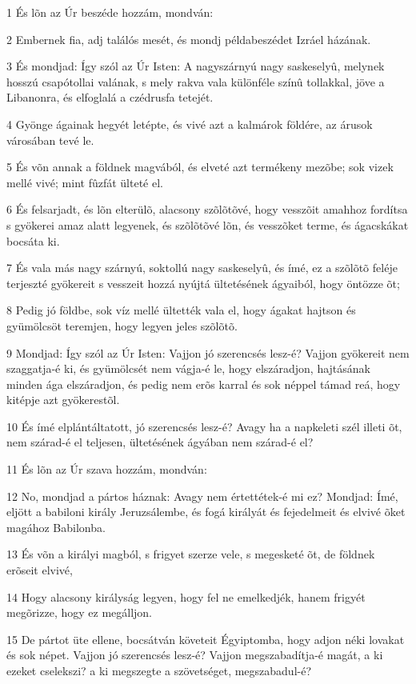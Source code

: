 \par 1 És lõn az Úr beszéde hozzám, mondván:
\par 2 Embernek fia, adj találós mesét, és mondj példabeszédet Izráel házának.
\par 3 És mondjad: Így szól az Úr Isten: A nagyszárnyú nagy saskeselyû, melynek hosszú csapótollai valának, s mely rakva vala különféle színû tollakkal, jöve a Libanonra, és elfoglalá a czédrusfa tetejét.
\par 4 Gyönge ágainak hegyét letépte, és vivé azt a kalmárok földére, az árusok városában tevé le.
\par 5 És võn annak a földnek magvából, és elveté azt termékeny mezõbe; sok vizek mellé vivé; mint fûzfát ülteté el.
\par 6 És felsarjadt, és lõn elterülõ, alacsony szõlõtõvé, hogy vesszõit amahhoz fordítsa s gyökerei amaz alatt legyenek, és szõlõtõvé lõn, és vesszõket terme, és ágacskákat bocsáta ki.
\par 7 És vala más nagy szárnyú, soktollú nagy saskeselyû, és ímé, ez a szõlõtõ feléje terjeszté gyökereit s vesszeit hozzá nyújtá ültetésének ágyaiból, hogy öntözze õt;
\par 8 Pedig jó földbe, sok víz mellé ültették vala el, hogy ágakat hajtson és gyümölcsöt teremjen, hogy legyen jeles szõlõtõ.
\par 9 Mondjad: Így szól az Úr Isten: Vajjon jó szerencsés lesz-é? Vajjon gyökereit nem szaggatja-é ki, és gyümölcsét nem vágja-é le, hogy elszáradjon, hajtásának minden ága elszáradjon, és pedig nem erõs karral és sok néppel támad reá, hogy kitépje azt gyökerestõl.
\par 10 És ímé elplántáltatott, jó szerencsés lesz-é? Avagy ha a napkeleti szél illeti õt, nem szárad-é el teljesen, ültetésének ágyában nem szárad-é el?
\par 11 És lõn az Úr szava hozzám, mondván:
\par 12 No, mondjad a pártos háznak: Avagy nem értettétek-é mi ez? Mondjad: Ímé, eljött a babiloni király Jeruzsálembe, és fogá királyát és fejedelmeit és elvivé õket magához Babilonba.
\par 13 És võn a királyi magból, s frigyet szerze vele, s megesketé õt, de földnek erõseit elvivé,
\par 14 Hogy alacsony királyság legyen, hogy fel ne emelkedjék, hanem frigyét megõrizze, hogy ez megálljon.
\par 15 De pártot üte ellene, bocsátván követeit Égyiptomba, hogy adjon néki lovakat és sok népet. Vajjon jó szerencsés lesz-é? Vajjon megszabadítja-é magát, a ki ezeket cselekszi? a ki megszegte a szövetséget, megszabadul-é?
